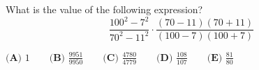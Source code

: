 What is the value of the following expression? $$\frac{100^2-7^2}{70^2-11^2} \cdot \frac{(70-11)(70+11)}{(100-7)(100+7)}$$

$\textbf{(A) } 1 \qquad \textbf{(B) } \frac{9951}{9950} \qquad \textbf{(C) } \frac{4780}{4779} \qquad \textbf{(D) } \frac{108}{107} \qquad \textbf{(E) } \frac{81}{80} $